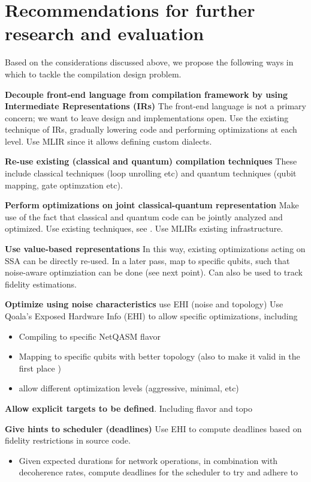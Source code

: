\section{Recommendations for further research and evaluation}
Based on the considerations discussed above, we propose the following ways in which to tackle the compilation design problem.


\textbf{Decouple front-end language from compilation framework by using Intermediate Representations (IRs)}
The front-end language is not a primary concern; we want to leave design and implementations open.
Use the existing technique of IRs, gradually lowering code and performing optimizations at each level.
Use MLIR since it allows defining custom dialects.

\textbf{Re-use existing (classical and quantum) compilation techniques}
These include classical techniques (loop unrolling etc) and quantum techniques (qubit mapping, gate optimzation etc).

\textbf{Perform optimizations on joint classical-quantum representation}
Make use of the fact that classical and quantum code can be jointly analyzed and optimized.
Use existing techniques, see .
Use MLIRs existing infrastructure.

\textbf{Use value-based representations}
In this way, existing optimizations acting on SSA can be directly re-used.
In a later pass, map to specific qubits, such that noise-aware optimziation can be done (see next point).
Can also be used to track fidelity estimations.

\textbf{Optimize using noise characteristics} use EHI (noise and topology)
Use Qoala's Exposed Hardware Info (EHI) to allow specific optimizations, including
\begin{itemize}
  \item Compiling to specific NetQASM flavor
  \item Mapping to specific qubits with better topology (also to make it valid in the first place )
  \item allow different optimization levels (aggressive, minimal, etc)
\end{itemize}

\textbf{Allow explicit targets to be defined}. Including flavor and topo

\textbf{Give hints to scheduler (deadlines)}
Use EHI to compute deadlines based on fidelity restrictions in source code.
\begin{itemize}
  \item Given expected durations for network operations, in combination with decoherence rates, compute deadlines for the scheduler to try and adhere to
\end{itemize}


